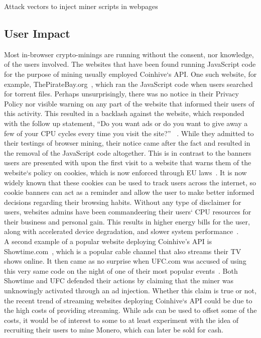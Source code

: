 \begin{center}
	\caption{Attack vectors to inject miner scripts in webpages}
\end{center}

\subsection{User Impact}

Most in-browser crypto-minings are running without the consent, nor knowledge, of the users involved. The websites that have been found running JavaScript code for the purpose of mining usually employed Coinhive`s API. One such website, for example, ThePirateBay.org~\cite{bbcmintcrypto}, which ran the JavaScript code when users searched for torrent files. Perhaps unsurprisingly, there was no notice in their Privacy Policy nor visible warning on any part of the website that informed their users of this activity. This resulted in a backlash against the website, which responded with the follow up statement, ``Do you want ads or do you want to give away a few of your CPU cycles every time you visit the site?'' ~\cite{piratesbayblog}. While they admitted to their testings of browser mining, their notice came after the fact and resulted in the removal of the JavaScript code altogether. This is in contrast to the banners users are presented with upon the first visit to a website that warns them of the website`s policy on cookies, which is now enforced through EU laws~\cite{eucookie}. It is now widely known that these cookies can be used to track users across the internet, so cookie banners can act as a reminder and allow the user to make better informed decisions regarding their browsing habits. Without any type of disclaimer for users, websites admins have been commandeering their users` CPU resources for their business and personal gain. This results in higher energy bills for the user, along with accelerated device degradation, and slower system performance~\cite{gaurdianelectricity}.
\\
A second example of a popular website deploying Coinhive’s API is Showtime.com~\cite{gaurdianelectricity}, which is a popular cable channel that also streams their TV shows online. It then came as no surprise when UFC.com was accused of using this very same code on the night of one of their most popular events~\cite{registerufcmonero}. Both Showtime and UFC defended their actions by claiming that the miner was unknowingly activated through an ad injection. Whether this claim is true or not, the recent trend of streaming websites deploying Coinhive`s API could be due to the high costs of providing streaming. While ads can be used to offset some of the costs, it would be of interest to some to at least experiment with the idea of recruiting their users to mine Monero, which can later be sold for cash.
